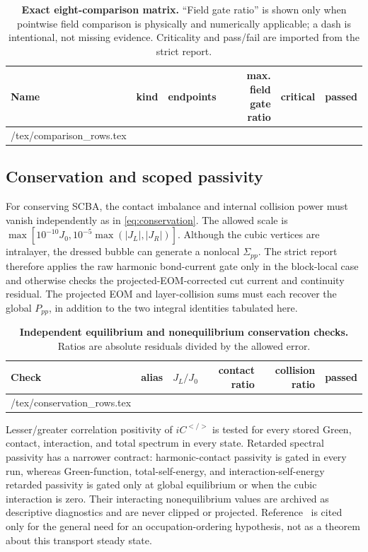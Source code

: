 \documentclass[11pt]{article}
\makeatletter
\renewcommand{\_}{\OriginalTextUnderscore\allowbreak}
\newcommand{\TableRowsInput}[1]{\@@input #1 }
\makeatother
\begin{document}
\begin{table}[p]
\centering
\caption{\textbf{Exact eight-comparison matrix.} ``Field gate ratio'' is
shown only when pointwise field comparison is physically and numerically
applicable; a dash is intentional, not missing evidence. Criticality and
pass/fail are imported from the strict report.}
\label{tab:comparisons}
\scriptsize
\begin{tabularx}{\textwidth}{@{}>{\raggedright\arraybackslash}p{34mm}>{\raggedright\arraybackslash}p{24mm}Xrll@{}}
\toprule
Name & kind & endpoints & max. field gate ratio & critical & passed \\
\midrule
\TableRowsInput{\ProductionStagingDir/tex/comparison_rows.tex}
\bottomrule
\end{tabularx}
\end{table}

\subsection{Conservation and scoped passivity}
\label{sec:production-diagnostics}

For conserving SCBA, the contact imbalance and internal collision power must
vanish independently as in \cref{eq:conservation}. The allowed scale is
\(\max[10^{-10}J_0,10^{-5}\max(|J_L|,|J_R|)]\). Although the cubic vertices
are intralayer, the dressed bubble can generate a nonlocal
\(\Sigma_{pp}\). The strict report therefore applies the raw harmonic
bond-current gate only in the block-local case and otherwise checks the
projected-EOM-corrected cut current and continuity residual. The projected
EOM and layer-collision sums must each recover the global \(P_{pp}\), in
addition to the two integral identities tabulated here.

\begin{table}[t]
\centering
\caption{\textbf{Independent equilibrium and nonequilibrium conservation
checks.} Ratios are absolute residuals divided by the allowed error.}
\label{tab:conservation-production}
\small
\begin{tabular}{@{}llrrrl@{}}
\toprule
Check & alias & \(J_L/J_0\) & contact ratio & collision ratio & passed \\
\midrule
\TableRowsInput{\ProductionStagingDir/tex/conservation_rows.tex}
\bottomrule
\end{tabular}
\end{table}

Lesser/greater correlation positivity of \(iC^{</>}\) is tested for every
stored Green, contact, interaction, and total spectrum in every state.
Retarded spectral passivity has a narrower contract: harmonic-contact
passivity is gated in every run, whereas Green-function, total-self-energy,
and interaction-self-energy retarded passivity is gated only at global
equilibrium or when the cubic interaction is zero. Their interacting
nonequilibrium values are archived as descriptive diagnostics and are never
clipped or projected. Reference~\cite{uhrig2019} is cited only for the
general need for an occupation-ordering hypothesis, not as a theorem about
this transport steady state.
\end{document}
